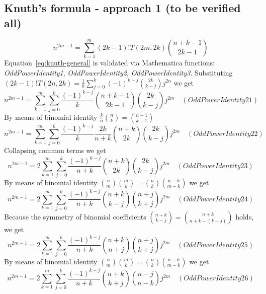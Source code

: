 \subsection{Knuth's formula - approach 1 (to be verified all)}\label{subsec:knuth's-formula---approach-1-(to-be-verified-all)}
\begin{equation}
    n^{2m-1} = \sum_{k=1}^{m} (2k-1)! T(2m,2k) \binom{n+k-1}{2k-1}\label{eq:knuth-general}
\end{equation}
Equation~\eqref{eq:knuth-general} is validated via Mathematica functions:
\textit{OddPowerIdentity1}, \textit{OddPowerIdentity2}, \textit{OddPowerIdentity3}.
Substituting $(2k-1)! T(2n,2k) = \frac{1}{k} \sum_{j=0}^{k} (-1)^{k-j} \binom{2k}{k-j} j^{2n}$ we get
\begin{equation*}
    n^{2m-1} = \sum_{k=1}^{m} \sum_{j=0}^{k} \frac{(-1)^{k-j}}{k} \binom{n+k-1}{2k-1} \binom{2k}{k-j} j^{2m} \quad
    (OddPowerIdentity21)
\end{equation*}
By means of binomial identity $\frac{k}{n} \binom{n}{k} = \binom{n-1}{k-1}$
\begin{equation*}
    n^{2m-1} = \sum_{k=1}^{m} \sum_{j=0}^{k} \frac{(-1)^{k-j}}{k} \frac{2k}{n+k} \binom{n+k}{2k} \binom{2k}{k-j} j^{2m} \quad
    (OddPowerIdentity22)
\end{equation*}
Collapsing common terms we get
\begin{equation*}
    n^{2m-1} = 2\sum_{k=1}^{m} \sum_{j=0}^{k} \frac{(-1)^{k-j}}{n+k} \binom{n+k}{2k} \binom{2k}{k-j} j^{2m} \quad
    (OddPowerIdentity23)
\end{equation*}
By means of binomial identity $\binom{n}{m} \binom{m}{k} = \binom{n}{k} \binom{n-k}{m-k}$ we get
\begin{equation*}
    n^{2m-1} = 2\sum_{k=1}^{m} \sum_{j=0}^{k} \frac{(-1)^{k-j}}{n+k} \binom{n+k}{k-j} \binom{n+j}{k+j} j^{2m} \quad
    (OddPowerIdentity24)
\end{equation*}
Because the symmetry of binomial coefficients $\binom{n+k}{k-j} = \binom{n+k}{n+k-(k-j)}$ holds, we get
\begin{equation*}
    n^{2m-1} = 2\sum_{k=1}^{m} \sum_{j=0}^{k} \frac{(-1)^{k-j}}{n+k} \binom{n+k}{n+j} \binom{n+j}{k+j} j^{2m} \quad
    (OddPowerIdentity25)
\end{equation*}
By means of binomial identity $\binom{n}{m} \binom{m}{k} = \binom{n}{k} \binom{n-k}{m-k}$ we get
\begin{equation*}
    n^{2m-1} = 2\sum_{k=1}^{m} \sum_{j=0}^{k} \frac{(-1)^{k-j}}{n+k} \binom{n+k}{k+j} \binom{n-j}{n-k} j^{2m} \quad
    (OddPowerIdentity26)
\end{equation*}

